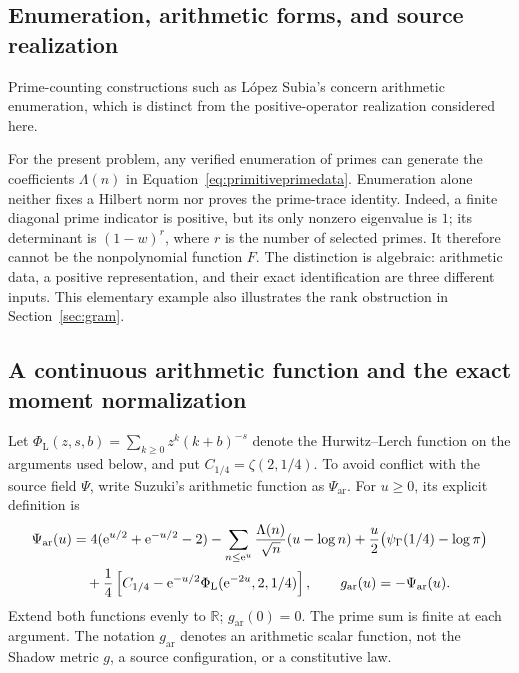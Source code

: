 \documentclass[11pt,letterpaper]{article}
\numberwithin{equation}{section}
\theoremstyle{definition}
\theoremstyle{remark}
\newcommand{\R}{\mathbb R}
\newcommand{\e}{\mathrm e}
\begin{document}
\subsection{Enumeration, arithmetic forms, and source realization}
\label{subsec:weilenumeration}
Prime-counting constructions such as L\'opez Subia's \cite{lopez2020,lopez2021} concern arithmetic enumeration, which is distinct from the positive-operator realization considered here.

For the present problem, any verified enumeration of primes can generate the coefficients $\Lambda(n)$ in Equation~\eqref{eq:primitiveprimedata}. Enumeration alone neither fixes a Hilbert norm nor proves the prime-trace identity. Indeed, a finite diagonal prime indicator is positive, but its only nonzero eigenvalue is $1$; its determinant is $(1-w)^r$, where $r$ is the number of selected primes. It therefore cannot be the nonpolynomial function $F$. The distinction is algebraic: arithmetic data, a positive representation, and their exact identification are three different inputs. This elementary example also illustrates the rank obstruction in Section~\ref{sec:gram}.

\subsection{A continuous arithmetic function and the exact moment normalization}
\label{subsec:screwnormalization}
Let $\Phi_{\mathrm L}(z,s,b)=\sum_{k\geq0}z^k(k+b)^{-s}$ denote the Hurwitz--Lerch function on the arguments used below, and put $C_{1/4}=\zeta(2,1/4)$. To avoid conflict with the source field $\Psi$, write Suzuki's arithmetic function as $\Psi_{\mathrm{ar}}$. For $u\geq0$, its explicit definition is \cite[Equation~(1.1)]{suzuki2023}
\begin{align}
 \Psi_{\mathrm{ar}}(u)
 &=4(\e^{u/2}+\e^{-u/2}-2)
 -\sum_{n\leq\e^u}\frac{\Lambda(n)}{\sqrt n}(u-\log n)
 +\frac u2\bigl(\psi_\Gamma(1/4)-\log\pi\bigr)\notag\\
 &\quad+\frac14\left[C_{1/4}
 -\e^{-u/2}\Phi_{\mathrm L}(\e^{-2u},2,1/4)\right],
 \qquad g_{\mathrm{ar}}(u)=-\Psi_{\mathrm{ar}}(u).
 \label{eq:arithmetic_screw}
\end{align}
Extend both functions evenly to $\R$; $g_{\mathrm{ar}}(0)=0$. The prime sum is finite at each argument. The notation $g_{\mathrm{ar}}$ denotes an arithmetic scalar function, not the Shadow metric $g$, a source configuration, or a constitutive law.
\end{document}
